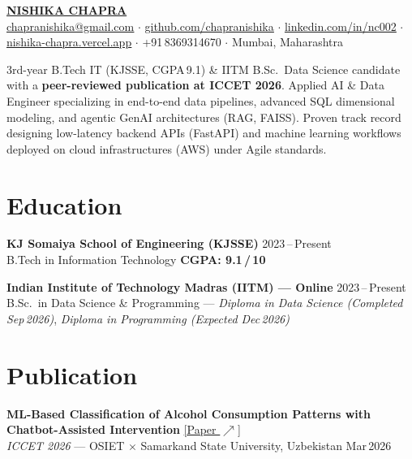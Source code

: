 \documentclass[9pt]{article}
\newcommand{\drivelink}[2]{\href{#1}{#2}}
\begin{document}
\begin{center}
  \href{https://nishika-chapra.vercel.app}{{{\large\bfseries NISHIKA CHAPRA}}}\\[5pt]
  \scriptsize
  \href{mailto:chapranishika@gmail.com}{\underline{chapranishika@gmail.com}} \;$\cdot$\; 
  \href{https://github.com/chapranishika}{\underline{github.com/chapranishika}} \;$\cdot$\; 
  \href{https://linkedin.com/in/nc002}{\underline{linkedin.com/in/nc002}} \;$\cdot$\; 
  \href{https://nishika-chapra.vercel.app}{\underline{nishika-chapra.vercel.app}} \;$\cdot$\; 
  +91\,8369314670 \;$\cdot$\; 
  Mumbai, Maharashtra
\end{center}
\vspace{-2pt}

\small
3rd-year B.Tech IT (KJSSE, CGPA\,9.1) \& IITM B.Sc.\ Data Science candidate with a \textbf{peer-reviewed publication at ICCET 2026}. Applied AI \& Data Engineer specializing in end-to-end data pipelines, advanced SQL dimensional modeling, and agentic GenAI architectures (RAG, FAISS). Proven track record designing low-latency backend APIs (FastAPI) and machine learning workflows deployed on cloud infrastructures (AWS) under Agile standards.
\normalsize

\section{Education}
\textbf{KJ Somaiya School of Engineering (KJSSE)} \hfill 2023\,--\,Present\\[-1pt]
{\small B.Tech in Information Technology \hfill \textbf{CGPA: 9.1\,/\,10}}

\vspace{3pt}
\textbf{Indian Institute of Technology Madras (IITM) --- Online} \hfill 2023\,--\,Present\\[-1pt]
{\small B.Sc.\ in Data Science \& Programming --- \textit{Diploma in Data Science (Completed Sep\,2026)}, \textit{Diploma in Programming (Expected Dec\,2026)}}

\section{Publication}
\textbf{ML-Based Classification of Alcohol Consumption Patterns with Chatbot-Assisted Intervention} 
\drivelink{https://drive.google.com/file/d/13DOjauPinLhMkZyL5ACZXexEDvVOXVWE/view?usp=sharing}{[\underline{Paper $\nearrow$}]}\\[-1pt]
{\small \textit{ICCET 2026} --- OSIET $\times$ Samarkand State University, Uzbekistan \hfill Mar\,2026}
\end{document}
